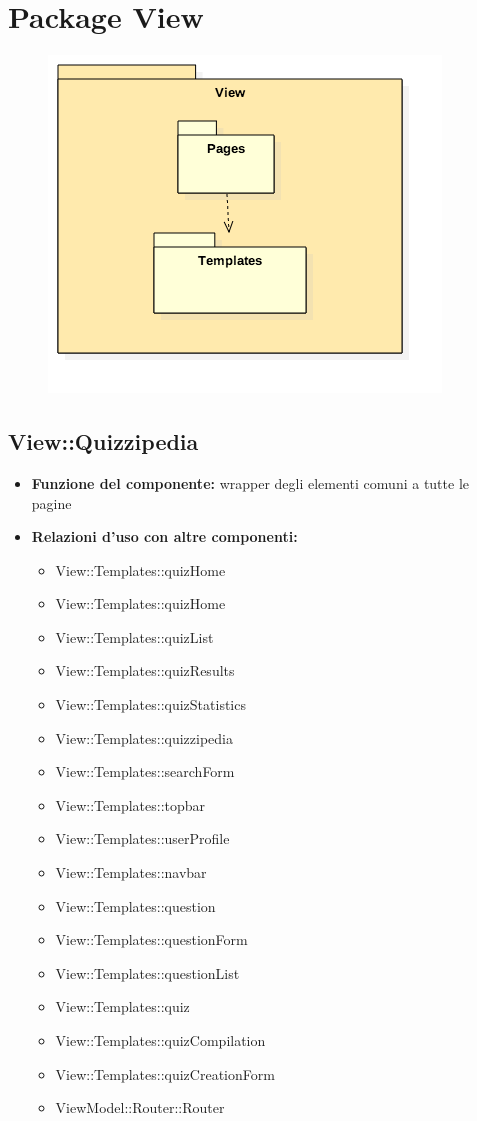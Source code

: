 \section{Package View}
\begin{figure}[h!]
\begin{center}
	\includegraphics[scale=0.7]{../images/ViewPackage.png}
\end{center}
\end{figure}

\subsection{View::Quizzipedia}
\begin{itemize}
\item\textbf{Funzione del componente:} wrapper degli elementi comuni a tutte le pagine
\item\textbf{Relazioni d'uso con altre componenti:} 
\begin{itemize}
	\item View::Templates::quizHome
\item View::Templates::quizHome
\item View::Templates::quizList
\item View::Templates::quizResults
\item View::Templates::quizStatistics
\item View::Templates::quizzipedia
\item View::Templates::searchForm
\item View::Templates::topbar
\item View::Templates::userProfile
\item View::Templates::navbar
\item View::Templates::question
\item View::Templates::questionForm
\item View::Templates::questionList
\item View::Templates::quiz
\item View::Templates::quizCompilation
\item View::Templates::quizCreationForm
\item ViewModel::Router::Router
\end{itemize}
\end{itemize}
\newpage

